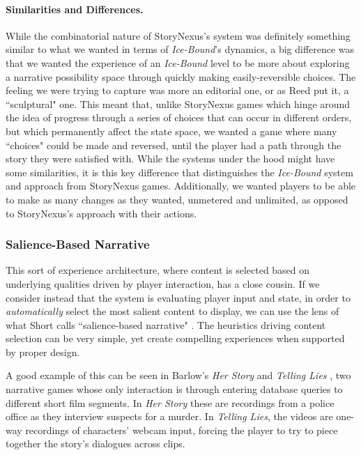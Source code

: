 \paragraph{Similarities and Differences.}\label{par:storynexus-similarities-and-differences}

While the combinatorial nature of StoryNexus's system was definitely something similar to what we wanted in terms of \textit{Ice-Bound}'s dynamics, a big difference was that we wanted the experience of an \textit{Ice-Bound} level to be more about exploring a narrative possibility space through quickly making easily-reversible choices. The feeling we were trying to capture was more an editorial one, or as Reed put it, a ``sculptural" one. This meant that, unlike StoryNexus games which hinge around the idea of progress through a series of choices that can occur in different orders, but which permanently affect the state space, we wanted a game where many ``choices" could be made and reversed, until the player had a path through the story they were satisfied with. While the systems under the hood might have some similarities, it is this key difference that distinguishes the \textit{Ice-Bound} system and approach from StoryNexus games. Additionally, we wanted players to be able to make as many changes as they wanted, unmetered and unlimited, as opposed to StoryNexus's approach with their actions.
\subsubsection{Salience-Based Narrative}\label{subsubsec:salience-based-narrative}

This sort of experience architecture, where content is selected based on underlying qualities driven by player interaction, has a close cousin. If we consider instead that the system is evaluating player input and state, in order to \textit{automatically} select the most salient content to display, we can use the lens of what Short calls ``salience-based narrative" \cite{short_salience}. The heuristics driving content selection can be very simple, yet create compelling experiences when supported by proper design.

A good example of this can be seen in Barlow's \textit{Her Story} \cite{barlowe_her_story} and \textit{Telling Lies} \cite{barlowe_telling_lies}, two narrative games whose only interaction is through entering database queries to different short film segments. In \textit{Her Story} these are recordings from a police office as they interview suspects for a murder. In \textit{Telling Lies}, the videos are one-way recordings of characters' webcam input, forcing the player to try to piece together the story's dialogues across clips.

